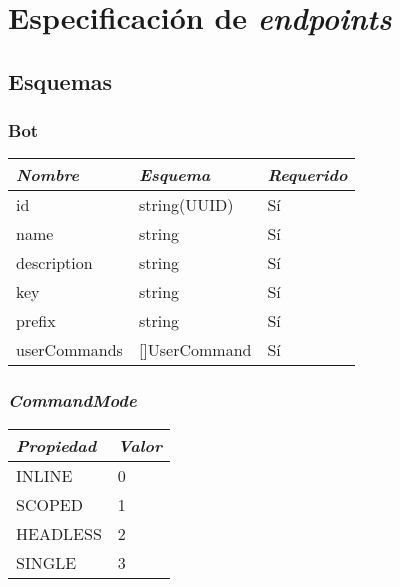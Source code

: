 \chapter{Especificación de \textit{endpoints}}

\section{Esquemas}

\subsection{Bot}
\begin{table}[H]
    \centering
    \def\arraystretch{1.25}
    \begin{adjustbox}{max width=\textwidth}
    \begin{tabularx}{\textwidth}{|L|l|l|}
    \hline
        \textbf{\textit{Nombre}} & \textbf{\textit{Esquema}} & \textbf{\textit{Requerido}} \\ \hline
    \hline
        id & string(UUID) & Sí \\ \hline
        name & string & Sí \\ \hline
        description & string & Sí \\ \hline
        key & string & Sí \\ \hline
        prefix & string & Sí \\ \hline
        userCommands & []UserCommand & Sí \\ \hline
    \end{tabularx}
    \end{adjustbox}
\end{table}

\subsection{\textit{CommandMode}}
\begin{table}[H]
    \centering
    \def\arraystretch{1.25}
    \begin{adjustbox}{max width=\textwidth}
    \begin{tabularx}{\textwidth}{|L|l|}
    \hline
        \textbf{\textit{Propiedad}} & \textbf{\textit{Valor}} \\ \hline
    \hline
        INLINE & 0 \\ \hline
        SCOPED & 1 \\ \hline
        HEADLESS & 2 \\ \hline
        SINGLE & 3 \\ \hline
    \end{tabularx}
    \end{adjustbox}
\end{table}

